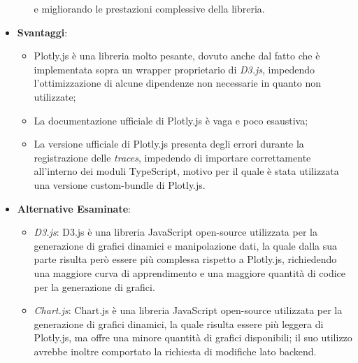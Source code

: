 \begin{itemize}
\begin{itemize}
                        e migliorando le prestazioni complessive della libreria.
            \end{itemize}
      \item \textbf{Svantaggi}:
            \begin{itemize}
                  \item Plotly.js è una libreria molto pesante, dovuto anche dal fatto che è implementata sopra un wrapper proprietario di \textit{D3.js},
                        impedendo l'ottimizzazione di alcune dipendenze non necessarie in quanto non utilizzate;
                  \item La documentazione ufficiale di Plotly.js è vaga e poco esaustiva;
                  \item La versione ufficiale di Plotly.js presenta degli errori durante la registrazione delle \textit{traces}, impedendo di importare correttamente
                         all'interno dei moduli TypeScript, motivo per il quale è stata utilizzata una versione custom-bundle di Plotly.js.
            \end{itemize}
      \item \textbf{Alternative Esaminate}:
            \begin{itemize}
                  \item \textit{D3.js}: D3.js è una libreria JavaScript open-source utilizzata per la generazione di grafici dinamici e manipolazione dati, la quale dalla sua parte risulta però
                        essere più complessa rispetto a Plotly.js, richiedendo una maggiore curva di apprendimento e una maggiore quantità di codice per la generazione di grafici.
                  \item \textit{Chart.js}: Chart.js è una libreria JavaScript open-source utilizzata per la generazione di grafici dinamici, la quale risulta essere più leggera di Plotly.js,
                        ma offre una minore quantità di grafici disponibili; il suo utilizzo avrebbe inoltre comportato la richiesta di modifiche lato backend.
            \end{itemize}
\end{itemize}

